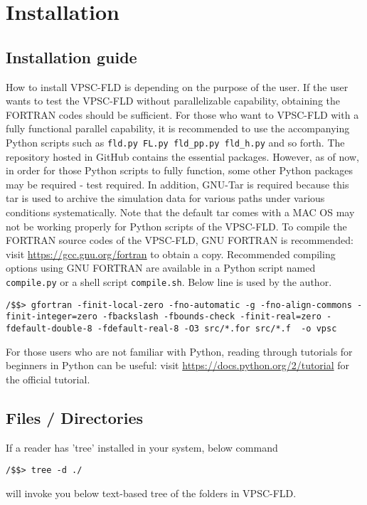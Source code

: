 \documentclass[12pt]{amsart}
\begin{document}
\section{Installation} %
\subsection{Installation guide}
\label{sec:installation}
How to install VPSC-FLD is depending on the purpose of the user.
If the user wants to test the VPSC-FLD without parallelizable capability, obtaining the FORTRAN codes should be sufficient.
For those who want to VPSC-FLD with a fully functional parallel capability, it is recommended to use the accompanying Python scripts such as \verb$fld.py FL.py fld_pp.py fld_h.py$ and so forth.
The repository hosted in GitHub contains the essential packages.
However, as of now, in order for those Python scripts to fully function, some other Python packages may be required - test required.
In addition, GNU-Tar is required because this tar is used to archive the simulation data for various paths under various conditions systematically.
Note that the default tar comes with a MAC OS may not be working properly for Python scripts of the VPSC-FLD.
To compile the FORTRAN source codes of the VPSC-FLD, GNU FORTRAN is recommended: visit \url{https://gcc.gnu.org/fortran} to obtain a copy.
Recommended compiling options using GNU FORTRAN are available in a Python script named \verb$compile.py$ or a shell script \verb$compile.sh$.
Below line is used by the author.
\begin{lstlisting}[style=python, caption=Compile command line recommended when using GNU FORTRAN]
/$$> gfortran -finit-local-zero -fno-automatic -g -fno-align-commons -finit-integer=zero -fbackslash -fbounds-check -finit-real=zero -fdefault-double-8 -fdefault-real-8 -O3 src/*.for src/*.f  -o vpsc
\end{lstlisting}
For those users who are not familiar with Python, reading through tutorials for beginners in Python can be useful: visit \url{https://docs.python.org/2/tutorial} for the official tutorial.
\newline
\subsection{Files / Directories}
If a reader has 'tree' installed in your system, below command
\begin{lstlisting}[style=sh, caption=Command tree,label={code:tree}]
/$$> tree -d ./
\end{lstlisting}
will invoke you below text-based tree of the folders in VPSC-FLD.
\end{document}
